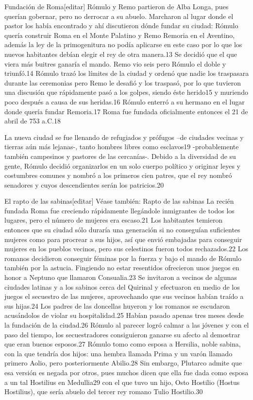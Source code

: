 \documentclass[11pt,a4paper]{book}
\begin{document}
	\bigskip
							Fundación de Roma[editar]
	\bigskip
							Rómulo y Remo partieron de Alba Longa, pues querían gobernar, pero no derrocar a su abuelo. Marcharon al lugar donde el pastor los había encontrado y ahí discutieron dónde fundar su ciudad: Rómulo quería construir Roma en el Monte Palatino y Remo Remoria en el Aventino, además la ley de la primogenitura no podía aplicarse en este caso por lo que los nuevos habitantes debían elegir el rey de otra manera.13 Se decidió que el que viera más buitres ganaría el mando. Remo vio seis pero Rómulo el doble y triunfó.14 Rómulo trazó los límites de la ciudad y ordenó que nadie los traspasara durante las ceremonias pero Remo le desafió y los traspasó, por lo que tuvieron una discusión que rápidamente pasó a los golpes, siendo éste herido15 y muriendo poco después a causa de sus heridas.16 Rómulo enterró a su hermano en el lugar donde quería fundar Remoria.17 Roma fue fundada oficialmente entonces el 21 de abril de 753 a.C.18
	\bigskip
							
	\bigskip
							La nueva ciudad se fue llenando de refugiados y prófugos –de ciudades vecinas y tierras aún más lejanas-, tanto hombres libres como esclavos19 -probablemente también campesinos y pastores de las cercanías-. Debido a la diversidad de su gente, Rómulo decidió organizarlos en un solo cuerpo político y originar leyes y costumbres comunes y nombró a los primeros cien patres, que el rey nombró senadores y cuyos descendientes serán los patricios.20
	\bigskip
							
	\bigskip
							El rapto de las sabinas[editar]
	\bigskip
							Véase también: Rapto de las sabinas
	\bigskip
							La recién fundada Roma fue creciendo rápidamente llegándole inmigrantes de todos los lugares, pero el número de mujeres era escaso.21 Los habitantes temieron entonces que su ciudad sólo duraría una generación si no conseguían suficientes mujeres como para procrear a sus hijos, así que envió embajadas para conseguir mujeres en los pueblos vecinos, pero sus celestinos fueron todos rechazados.22 Los romanos decidieron conseguir féminas por la fuerza y bajo el mando de Rómulo también por la astucia. Fingiendo no estar resentidos ofrecieron unos juegos en honor a Neptuno que llamaron Consualia.23 Se invitaron a vecinos de algunas ciudades latinas y a los sabinos cerca del Quirinal y efectuaron en medio de los juegos el secuestro de las mujeres, aprovechando que sus vecinos habían traído a sus hijas.24 Los padres de las doncellas huyeron y los romanos se escudaron acusándolos de violar su hospitalidad.25 Habían pasado apenas tres meses desde la fundación de la ciudad.26 Rómulo al parecer logró calmar a las jóvenes y con el paso del tiempo, los secuestradores consiguieron ganarse su afecto al demostrar que eran buenos esposos.27 Rómulo tomo como esposa a Hersilia, noble sabina, con la que tendría dos hijos: una hembra llamada Prima y un varón llamado primero Aolio, pero posteriormente Abilio.28 Sin embargo, Plutarco admite que esa versión es negada por otros, pues muchos dicen que ella fue dada como esposa a un tal Hostilius en Medullia29 con el que tuvo un hijo, Osto Hostilio (Hostus Hostilius), que sería abuelo del tercer rey romano Tulio Hostilio.30
	\bigskip
							
\end{document}
